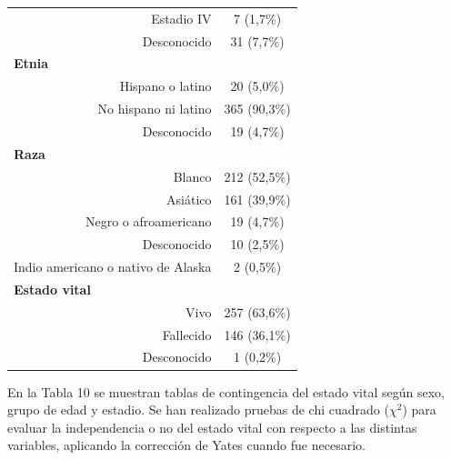 \begin{table}[H]
\begin{tabular}{rc}
		Estadio IV                                     & 7 (1,7\%)                                        \\
		Desconocido                                    & 31 (7,7\%)                                       \\ \hline
		\multicolumn{1}{l}{\textbf{Etnia}}             &                                                  \\
		Hispano o latino                               & 20 (5,0\%)                                         \\
		No hispano ni latino                           & 365 (90,3\%)                                     \\
		Desconocido                                    & 19 (4,7\%)                                       \\ \hline
		\multicolumn{1}{l}{\textbf{Raza}}              &                                                  \\
		Blanco                                         & 212 (52,5\%)                                     \\
		Asiático                                       & 161 (39,9\%)                                     \\
		Negro o afroamericano                          & 19 (4,7\%)                                       \\
		Desconocido                                    & 10 (2,5\%)                                       \\
		Indio americano o nativo de Alaska             & 2 (0,5\%)                                        \\ \hline
		\multicolumn{1}{l}{\textbf{Estado vital}}      &                                                  \\ 
		Vivo                                           & 257 (63,6\%)                                     \\
		Fallecido                                         & 146 (36,1\%)                                     \\
		Desconocido                                    & 1 (0,2\%)                                        \\ \hline
	\end{tabular}
\end{table}

En la Tabla 10 se muestran tablas de contingencia del estado vital según sexo, grupo de edad y estadio. Se han realizado pruebas de chi cuadrado ($\chi^2$) \cite{Pearson1900} para evaluar la independencia o no del estado vital con respecto a las distintas variables, aplicando la corrección de Yates \cite{Yates1934} cuando fue necesario.\\

